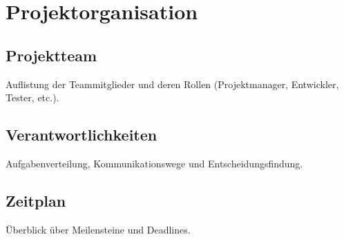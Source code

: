 \section{Projektorganisation}
\subsection{Projektteam}
Auflistung der Teammitglieder und deren Rollen (Projektmanager, Entwickler, Tester, etc.).

\subsection{Verantwortlichkeiten}
Aufgabenverteilung, Kommunikationswege und Entscheidungsfindung.

\subsection{Zeitplan}
Überblick über Meilensteine und Deadlines.